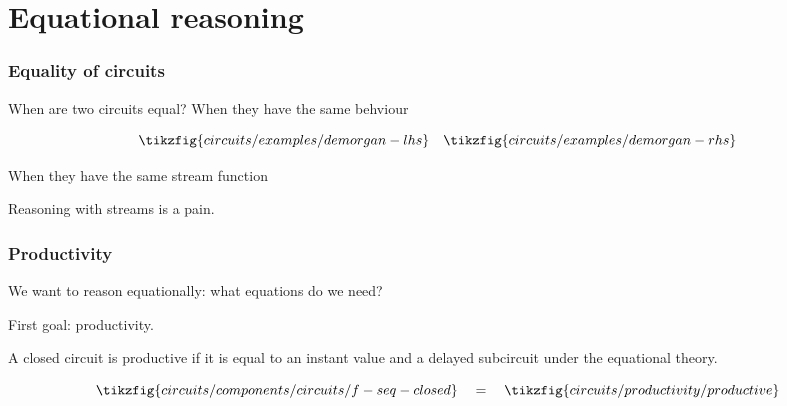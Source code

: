 \section{Equational reasoning}

\begin{frame}
    \frametitle{Equality of circuits}

    When are two circuits equal?
    \wait
    When they have the same \alert{behviour}

    \wait

    \[
        \tikzfig{circuits/examples/demorgan-lhs} 
        \quad
        \tikzfig{circuits/examples/demorgan-rhs} 
    \]

    \wait

    When they have the same \alert{stream function}

    \wait

    Reasoning with streams is a \alert{pain}.
    
\end{frame}

\begin{frame}
    \frametitle{Productivity}

    We want to reason \alert{equationally}: what equations do we need?

    \wait

    First goal: \alert{productivity}.

    \wait

    A closed circuit is \alert{productive} if it is equal to an \alert{instant value} and a \alert{delayed subcircuit} under the equational theory.

    \[
        \tikzfig{circuits/components/circuits/f-seq-closed}
        \quad
        =
        \quad    
        \tikzfig{circuits/productivity/productive}
    \]

\end{frame}


